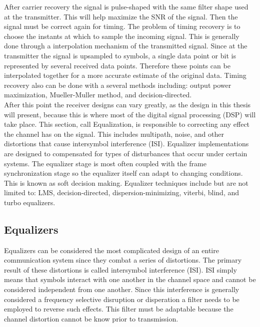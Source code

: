 After carrier recovery the signal is pulse-shaped with the same filter shape used at the transmitter.  This will help maximize the SNR of the signal.  Then the signal must be correct again for timing.  The problem of timing recovery is to choose the instants at which to sample the incoming signal.  This is generally done through a interpolation mechanism of the transmitted signal.  Since at the transmitter the signal is upsampled to symbols, a single data point or bit is represented by several received data points.  Therefore these points can be interpolated together for a more accurate estimate of the original data.  Timing recovery also can be done with a several methods including: output power maximization, Mueller-Muller method, and decision-directed.\\

After this point the receiver designs can vary greatly, as the design in this thesis will present, because this is where most of the digital signal processing (DSP) will take place.  This section, call Equalization, is responsible to correcting any effect the channel has on the signal. This includes multipath, noise, 	and other distortions that cause intersymbol interference (ISI).  Equalizer implementations are designed to compensated for types of disturbances that occur under certain systems.  The equalizer stage is most often coupled with the frame synchronization stage so the equalizer itself can adapt to changing conditions.  This is known as soft decision making.  Equalizer techniques include but are not limited to: LMS, decision-directed, dispersion-minimizing, viterbi, blind, and turbo equalizers.\\  

\subsection{Equalizers}

Equalizers can be considered the most complicated design of an entire communication system since they combat a series of distortions.  The primary result of these distortions is called intersymbol interference (ISI).  ISI simply means that symbols interact with one another in the channel space and cannot be considered independent from one another.  Since this interference is generally considered a frequency selective disruption or disperation a filter needs to be employed to reverse such effects.  This filter must be adaptable because the channel distortion cannot be know prior to transmission.\\  

